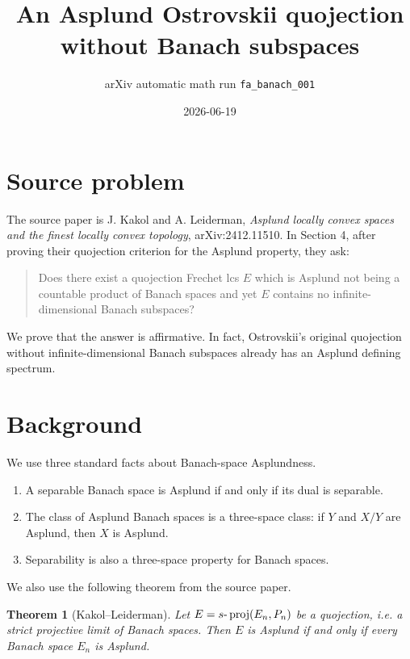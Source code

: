 \documentclass[11pt]{article}
\title{An Asplund Ostrovskii quojection without Banach subspaces}
\author{arXiv automatic math run \texttt{fa\_banach\_001}}
\date{2026-06-19}
\newtheorem{theorem}{Theorem}
\begin{document}
\maketitle

\section*{Source problem}

The source paper is J. Kakol and A. Leiderman,
\emph{Asplund locally convex spaces and the finest locally convex topology},
arXiv:2412.11510.  In Section 4, after proving their quojection criterion for
the Asplund property, they ask:

\begin{quote}
Does there exist a quojection Frechet lcs \(E\) which is Asplund not being a
countable product of Banach spaces and yet \(E\) contains no
infinite-dimensional Banach subspaces?
\end{quote}

We prove that the answer is affirmative.  In fact, Ostrovskii's original
quojection without infinite-dimensional Banach subspaces already has an
Asplund defining spectrum.

\section*{Background}

We use three standard facts about Banach-space Asplundness.

\begin{enumerate}
\item A separable Banach space is Asplund if and only if its dual is separable.
\item The class of Asplund Banach spaces is a three-space class: if \(Y\) and
      \(X/Y\) are Asplund, then \(X\) is Asplund.
\item Separability is also a three-space property for Banach spaces.
\end{enumerate}

We also use the following theorem from the source paper.

\begin{theorem}[Kakol--Leiderman]
\label{thm:KL}
Let \(E=s\hbox{-}\operatorname{proj}(E_n,P_n)\) be a quojection, i.e. a strict
projective limit of Banach spaces.  Then \(E\) is Asplund if and only if every
Banach space \(E_n\) is Asplund.
\end{theorem}
\end{document}
